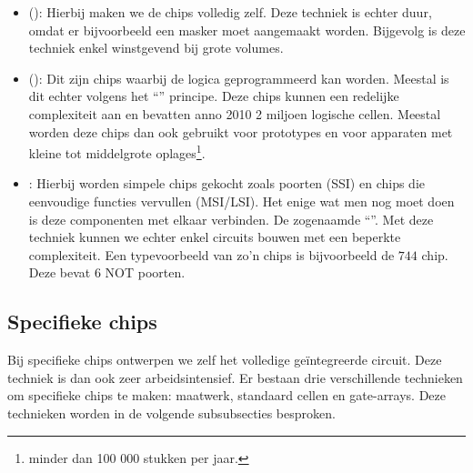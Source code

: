\begin{itemize}
 \item {} (): Hierbij maken we de chips volledig zelf. Deze techniek is echter duur, omdat er bijvoorbeeld een masker moet aangemaakt worden. Bijgevolg is deze techniek enkel winstgevend bij grote volumes.
 \item {} (): Dit zijn chips waarbij de logica geprogrammeerd kan worden. Meestal is dit echter volgens het ``'' principe. Deze chips kunnen een redelijke complexiteit aan en bevatten anno 2010 2 miljoen logische cellen. Meestal worden deze chips dan ook gebruikt voor prototypes en voor apparaten met kleine tot middelgrote oplages\footnote{minder dan 100 000 stukken per jaar.}.
 \item {}: Hierbij worden simpele chips gekocht zoals poorten (SSI) en chips die eenvoudige functies vervullen (MSI/LSI). Het enige wat men nog moet doen is deze componenten met elkaar verbinden. De zogenaamde ``''. Met deze techniek kunnen we echter enkel circuits bouwen met een beperkte complexiteit. Een typevoorbeeld van zo'n chips is bijvoorbeeld de $744$ chip. Deze bevat $6$ NOT poorten.
\end{itemize}

\subsection{Specifieke chips}
Bij specifieke chips ontwerpen we zelf het volledige ge\"integreerde circuit. Deze techniek is dan ook zeer arbeidsintensief. Er bestaan drie verschillende technieken om specifieke chips te maken: maatwerk, standaard cellen en gate-arrays. Deze technieken worden in de volgende subsubsecties besproken.
